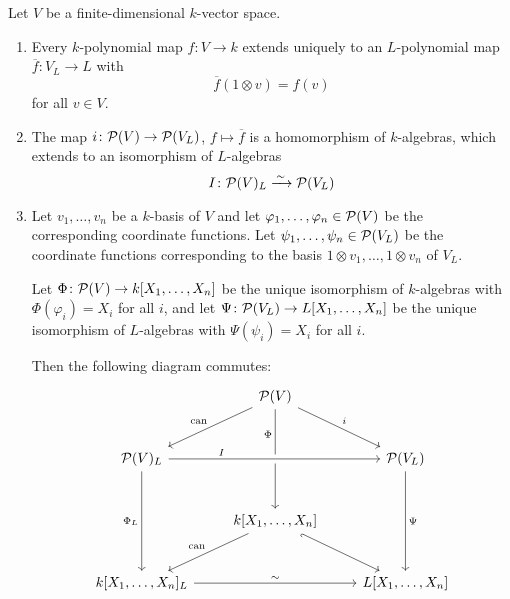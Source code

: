 \begin{proposition}
  \label{proposition: consistent choice of identification for polynomial functions}
  Let $V$ be a finite-dimensional $k$-vector space.
  \begin{enumerate}
    \item
      Every $k$-polynomial map $f \colon V \to k$ extends uniquely to an $L$-polynomial map $\overline{f} \colon V_L \to L$ with
      \[
          \overline{f}(1 \otimes v)
        = f(v)
      \]
      for all $v \in V$.
    \item
      The map $i \colon \mathcal{P}(V) \to \mathcal{P}(V_L)$, $f \mapsto \overline{f}$ is a homomorphism of $k$-algebras, which extends to an isomorphism of $L$-algebras
      \[
                                I
        \colon                  \mathcal{P}(V)_L
        \xrightarrow{\,\sim\,}  \mathcal{P}(V_L)
      \]
    \item
      Let $v_1, \dotsc, v_n$ be a $k$-basis of $V$ and let $\varphi_1, \dotsc, \varphi_n \in \mathcal{P}(V)$ be the corresponding coordinate functions.
      Let $\psi_1, \dotsc, \psi_n \in \mathcal{P}(V_L)$ be the coordinate functions corresponding to the basis $1 \otimes v_1, \dotsc, 1 \otimes v_n$ of $V_L$.
      
      Let $\Phi \colon \mathcal{P}(V) \to k[X_1, \dotsc, X_n]$ be the unique isomorphism of $k$-algebras with $\Phi(\varphi_i) = X_i$ for all $i$, and let $\Psi \colon \mathcal{P}(V_L) \to L[X_1, \dotsc, X_n]$ be the unique isomorphism of $L$-algebras with $\Psi(\psi_i) = X_i$ for all $i$.
      
      Then the following diagram commutes:
      \begin{equation}
        \label{equaton: commuting prim}
        \begin{tikzcd}[row sep = large]
            {}
          & \mc{P}(V)
            \arrow{dl}[above left]{\can}
            \arrow{dr}[above right]{i}
            \arrow{dd}[near start, left]{\Phi}
          & {}
          \\
            \mc{P}(V)_L
            \arrow[crossing over]{rr}[near start, above]{I}
            \arrow{dd}[left]{\Phi_L}
          & {}
          & \mc{P}(V_L)
            \arrow{dd}[right]{\Psi}
          \\
            {}
          & k[X_1, \dotsc, X_n]
            \arrow{dl}[above left]{\can}
            \arrow[hook']{dr}
          & {}
          \\
            k[X_1, \dotsc, X_n]_L
            \arrow{rr}[above]{\sim}
          & {}
          & L[X_1, \dotsc, X_n]
        \end{tikzcd}
      \end{equation}
  \end{enumerate}
\end{proposition}


